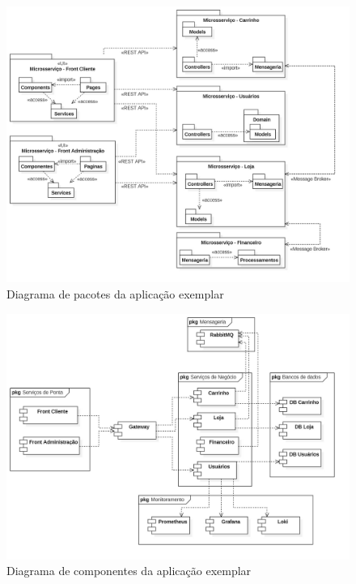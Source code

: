 \begin{figure}[htb]
	\caption{\label{figura-diagrama-de-pacotes}Diagrama de pacotes da aplicação exemplar}
	\begin{center}
	    \includegraphics[scale=0.27]{Diagramas/imagens/PackageDiagramComFinanceiro.jpg}
	\end{center}
\end{figure}

\begin{figure}[htb]
	\caption{\label{figura-diagrama-de-componentes}Diagrama de componentes da aplicação exemplar}
	\begin{center}
	    \includegraphics[scale=0.27]{Diagramas/imagens/ComponentsComFinanceiro.jpg}
	\end{center}
\end{figure}

